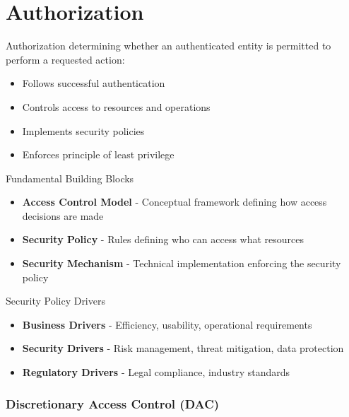 \section{Authorization}


\begin{definition}{Authorization}
determining whether an authenticated entity is permitted to perform a requested action:
\begin{itemize}
    \item Follows successful authentication
    \item Controls access to resources and operations
    \item Implements security policies
    \item Enforces principle of least privilege
\end{itemize}
\end{definition}

\begin{concept}{Fundamental Building Blocks}
\begin{itemize}
    \item \textbf{Access Control Model} - Conceptual framework defining how access decisions are made
    \item \textbf{Security Policy} - Rules defining who can access what resources
    \item \textbf{Security Mechanism} - Technical implementation enforcing the security policy
\end{itemize}
\end{concept}

\begin{theorem}{Security Policy Drivers}
\begin{itemize}
    \item \textbf{Business Drivers} - Efficiency, usability, operational requirements
    \item \textbf{Security Drivers} - Risk management, threat mitigation, data protection
    \item \textbf{Regulatory Drivers} - Legal compliance, industry standards
\end{itemize}
\end{theorem}



\subsubsection{Discretionary Access Control (DAC)}


